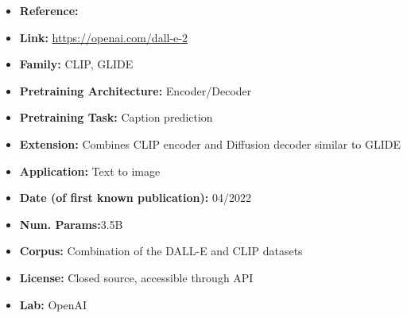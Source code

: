 \documentclass{article}
\begin{document}
            \begin{itemize}
                \item \textbf{Reference:} 
                \item \textbf{Link:} \url{https://openai.com/dall-e-2}
                \item \textbf{Family:} CLIP, GLIDE 
                \item \textbf{Pretraining Architecture:} Encoder/Decoder
                \item \textbf{Pretraining Task:} Caption prediction
                \item \textbf{Extension:} Combines CLIP encoder and Diffusion decoder similar to GLIDE  
                \item \textbf{Application:} Text to image
                \item \textbf{Date (of first known publication):} 04/2022
                \item \textbf{Num. Params:}3.5B
                \item \textbf{Corpus:} Combination of the DALL-E and CLIP datasets
                \item \textbf{License:} Closed source, accessible through API
                \item \textbf{Lab:} OpenAI
            \end{itemize}

\end{document}
